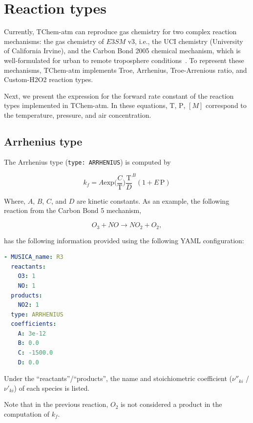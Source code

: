 \documentclass[report, 12pt]{SANDreport}
\newcommand{\eee}{E3SM}
\begin{document}
\section{Reaction types}
Currently, TChem-atm can reproduce gas chemistry for two complex reaction mechanisms: the gas chemistry of $\eee{}$ v3, i.e., the UCI chemistry (University of California Irvine), and the Carbon Bond 2005 chemical mechanism, which is well-formulated for urban to remote troposphere conditions~\cite{Yarwood2005,Dawson2022}.
To represent these mechanisms, TChem-atm implements Troe, Arrhenius, Troe-Arrenious ratio, and Custom-H2O2 reaction types.

Next, we present the expression for the forward rate constant of the reaction types implemented in TChem-atm. In these equations, $\mathrm{T}$, $\mathrm{P}$, $[M]$ correspond to the temperature, pressure, and air concentration.

\subsection{Arrhenius type}

The Arrhenius type (\verb|type: ARRHENIUS|) is computed by

\begin{equation}
k_f = A \mathrm{exp} \Big( \frac{C}{\mathrm{T}} \Big)  \frac{\mathrm{T}}{D}^B (1+ E\,\mathrm{P})
\end{equation}

Where, $A$, $B$, $C$, and $D$ are kinetic constants. As an example, the following reaction from the Carbon Bond 5 mechanism,

\begin{equation}
O_3 + NO \rightarrow NO_2 + O_2,
\end{equation}

has the following information provided using the following YAML configuration:

\begin{lstlisting}[language=yaml]
- MUSICA_name: R3
  reactants:
    O3: 1
    NO: 1
  products:
    NO2: 1
  type: ARRHENIUS
  coefficients:
    A: 3e-12
    B: 0.0
    C: -1500.0
    D: 0.0
\end{lstlisting}

Under the ``reactants''/``products'', the name and stoichiometric coefficient ($\nu''_{ki}$ /$\nu'_{ki}$) of each species is listed.

Note that in the previous reaction, $O_2$ is not considered a product in the computation of $k_f$.
\end{document}
